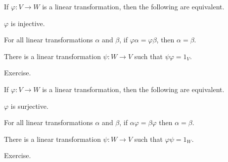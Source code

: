 \begin{prp}
If $\varphi : V \rightarrow W$ is a linear transformation, then the following are equivalent.
\begin{enumerate*}
\item $\varphi$ is injective.
\item For all linear transformations $\alpha$ and $\beta$, if $\varphi\alpha = \varphi\beta$, then $\alpha = \beta$.
\item There is a linear transformation $\psi : W \rightarrow V$ such that $\psi\varphi = 1_V$.
\end{enumerate*}
\end{prp}

\begin{theproof}
Exercise.
\end{theproof}

\begin{prp}
If $\varphi : V \rightarrow W$ is a linear transformation, then the following are equivalent.
\begin{enumerate*}
\item $\varphi$ is surjective.
\item For all linear transformations $\alpha$ and $\beta$, if $\alpha\varphi = \beta\varphi$ then $\alpha = \beta$.
\item There is a linear transformation $\psi : W \rightarrow V$ such that $\varphi\psi = 1_W$.
\end{enumerate*}
\end{prp}

\begin{theproof}
Exercise.
\end{theproof}

\NowForSomeExercises

